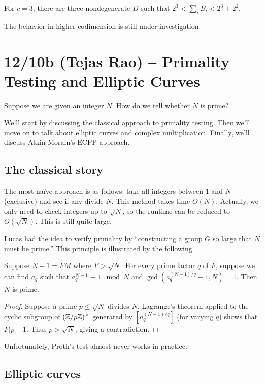\documentclass{amsart}
\begin{document}
\begin{thm}
	For $c=3$, there are three nondegenerate $D$ such that $2^3 < \sum_i B_i < 2^3 + 2^2$.
\end{thm}

The behavior in higher codimension is still under investigation.

\section{12/10b (Tejas Rao) -- Primality Testing and Elliptic Curves}

Suppose we are given an integer $N$.
How do we tell whether $N$ is prime?

We'll start by discussing the classical approach to primality testing.
Then we'll move on to talk about elliptic curves and complex multiplication.
Finally, we'll discuss Atkin-Morain's ECPP approach.

\subsection{The classical story}

The most na\"ive approach is as follows: take all integers between $1$ and $N$ (exclusive) and see if any divide $N$.
This method takes time $O(N)$.
Actually, we only need to check integers up to $\sqrt{N}$, so the runtime can be reduced to $O(\sqrt{N})$.
This is still quite large.

Lucas had the idea to verify primality by ``constructing a group $G$ so large that $N$ must be prime.''
This principle is illustrated by the following.

\begin{thm}
	Suppose $N - 1 = FM$ where $F > \sqrt{N}$.
	For every prime factor $q$ of $F$, suppose we can find $a_q$ such that $a_q^{N-1} \equiv 1 \mod N$ and $\gcd(a_q^{(N-1)/q} - 1, N) = 1$.
	Then $N$ is prime.
\end{thm}

\begin{proof}
	Suppose a prime $p \leq \sqrt{N}$ divides $N$.
	Lagrange's theorem applied to the cyclic subgroup of $(\mathbb{Z} / p \mathbb{Z})^\times$ generated by $[a_q^{(N-1)/q}]$ (for varying $q$) shows that $F | p - 1$.
	Thus $p > \sqrt{N}$, giving a contradiction.
\end{proof}

Unfortunately, Proth's test almost never works in practice.

\subsection{Elliptic curves}
\end{document}
